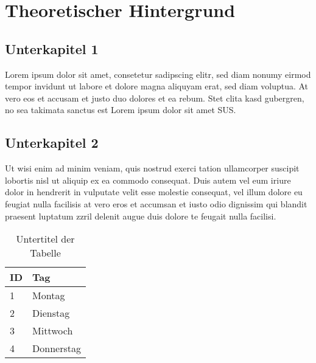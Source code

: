 \section{Theoretischer Hintergrund}
\subsection{Unterkapitel 1}
Lorem ipsum dolor sit amet, consetetur sadipscing elitr, sed diam nonumy eirmod tempor invidunt ut labore et dolore magna aliquyam erat, sed diam voluptua. At vero eos et accusam et justo duo dolores et ea rebum. Stet clita kasd gubergren, no sea takimata sanctus est Lorem ipsum dolor sit amet \ac{SUS}.   

\subsection{Unterkapitel 2}
Ut wisi enim ad minim veniam, quis nostrud exerci tation ullamcorper suscipit lobortis nisl ut aliquip ex ea commodo consequat. Duis autem vel eum iriure dolor in hendrerit in vulputate velit esse molestie consequat, vel illum dolore eu feugiat nulla facilisis at vero eros et accumsan et iusto odio dignissim qui blandit praesent luptatum zzril delenit augue duis dolore te feugait nulla facilisi.   

\begin{table}[!ht]
    \centering
    \begin{tabular}{ll}
    \hline
        ID & Tag \\ \hline
        1 & Montag \\ 
        2 & Dienstag \\ 
        3 & Mittwoch \\ 
        4 & Donnerstag \\ \hline
    \end{tabular}
    \caption[Text, der im Tablellenverzeichnis angezeigt wird]{Untertitel der Tabelle}
\end{table}